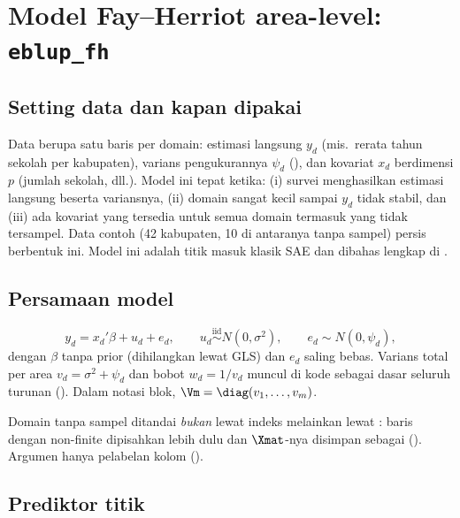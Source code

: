 \section{Model Fay--Herriot area-level: \texttt{eblup\_fh}}\label{sec:fh}

\subsection{Setting data dan kapan dipakai}\label{sec:fh-setting}

Data berupa satu baris per domain: estimasi langsung $y_d$ (mis.\ rerata
tahun sekolah per kabupaten), varians pengukurannya $\psi_d$ (),
dan kovariat $x_d$ berdimensi $p$ (jumlah sekolah, dll.). Model ini tepat
ketika: (i) survei menghasilkan estimasi langsung beserta variansnya, (ii)
domain sangat kecil sampai $y_d$ tidak stabil, dan (iii) ada kovariat yang
tersedia untuk semua domain termasuk yang tidak tersampel. Data contoh
 (42 kabupaten, 10 di antaranya tanpa sampel) persis berbentuk ini.
Model ini adalah titik masuk klasik SAE \citep{fay1979small} dan dibahas
lengkap di \citet{rao2015small}.

\subsection{Persamaan model}\label{sec:fh-model}

\begin{equation}
  y_d=x_d'\beta+u_d+e_d,\qquad
  u_d\overset{\text{iid}}{\sim}N(0,\sigma^2),\qquad
  e_d\sim N(0,\psi_d),
  \label{eq:fh-model}
\end{equation}
dengan $\beta$ tanpa prior (dihilangkan lewat GLS) dan $e_d$ saling bebas.
Varians total per area $v_d=\sigma^2+\psi_d$ dan bobot
$w_d=1/v_d$ muncul di kode sebagai dasar seluruh turunan
(). Dalam notasi blok, $\Vm=\diag(v_1,\dots,v_m)$.

Domain tanpa sampel ditandai \emph{bukan} lewat indeks melainkan lewat
: baris dengan  non-finite dipisahkan lebih dulu dan
$\Xmat$-nya disimpan sebagai  ().
Argumen  hanya pelabelan kolom ().

\subsection{Prediktor titik}\label{sec:fh-prediktor}

